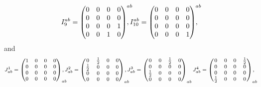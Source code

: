 \begin{equation}
\begin{gathered}
  I^{ab}_9 = \begin{pmatrix}0 & 0 & 0 & 0 \\ 0 & 0 & 0 & 0 \\ 0 & 0 & 0 & 1 \\ 0 & 0 & 1 & 0\end{pmatrix}^{ab}\hspace{-1em}, I^{ab}_{10} = \begin{pmatrix}0 & 0 & 0 & 0 \\ 0 & 0 & 0 & 0 \\ 0 & 0 & 0 & 0 \\ 0 & 0 & 0 & 1\end{pmatrix}^{ab}\hspace{-1em},
  \end{gathered}
\end{equation}
and
\begin{equation}\label{inter_metric_J}
  \footnotesize
  \begin{gathered}
    J_{ab}^1 = \begin{pmatrix}1 & 0 & 0 & 0 \\ 0 & 0 & 0 & 0 \\ 0 & 0 & 0 & 0 \\ 0 & 0 & 0 & 0\end{pmatrix}_{ab}\hspace{-1em}, J_{ab}^2 = \begin{pmatrix}0 & \frac{1}{2} & 0 & 0 \\ \frac{1}{2} & 0 & 0 & 0 \\ 0 & 0 & 0 & 0 \\ 0 & 0 & 0 & 0\end{pmatrix}_{ab}\hspace{-1em}, J_{ab}^3 = \begin{pmatrix}0 & 0 & \frac{1}{2} & 0 \\ 0 & 0 & 0 & 0 \\ \frac{1}{2} & 0 & 0 & 0 \\ 0 & 0 & 0 & 0\end{pmatrix}_{ab} J_{ab}^4 = \begin{pmatrix}0 & 0 & 0 & \frac{1}{2} \\ 0 & 0 & 0 & 0 \\ 0 & 0 & 0 & 0 \\ \frac{1}{2} & 0 & 0 & 0\end{pmatrix}_{ab}\hspace{-1em}, \\

\end{gathered}
\end{equation}
